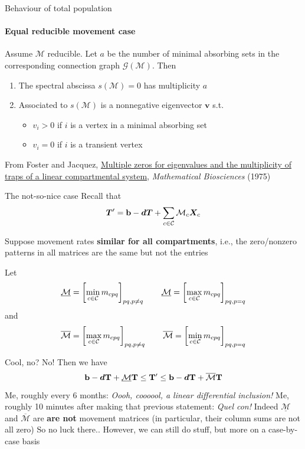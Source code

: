 \documentclass[aspectratio=169]{beamer}\usepackage[]{graphicx}\usepackage[]{xcolor}
\begin{document}
\begin{frame}{Behaviour of total population}
\framesubtitle{Equal reducible movement case}
\begin{theorem}
Assume $\mathcal{M}$ reducible. Let $a$ be the number of minimal absorbing sets in the corresponding connection graph $\mathcal{G}(\mathcal{M})$. Then
\begin{enumerate}
	\item The spectral abscissa $s(\mathcal{M})=0$ has multiplicity $a$
	\item Associated to $s(\mathcal{M})$ is a nonnegative eigenvector $\mathbf{v}$ s.t.
	\begin{itemize}
		\item $v_i>0$ if $i$ is a vertex in a minimal absorbing set
		\item $v_i=0$ if $i$ is a transient vertex
	\end{itemize}
\end{enumerate}
\end{theorem}

\vfill
From Foster and Jacquez, \href{https://doi.org/10.1016/0025-5564(75)90096-6}{Multiple zeros for eigenvalues and the multiplicity of traps of a linear compartmental system}, \emph{Mathematical Biosciences} (1975)
\end{frame}


\begin{frame}{The not-so-nice case}
Recall that
$$
\bm{T}'=\mathbf{b}-\bm{d}\bm{T}+\sum_{c\in\mathcal{C}}\mathcal{M}_c\bm{X}_{c}
$$

Suppose movement rates \textbf{similar for all compartments}, i.e., the zero/nonzero patterns in all matrices are the same but not the entries

Let
$$
\underline{\mathcal{M}}=\left[\min_{c\in\mathcal{C}}m_{cpq}\right]_{pq,p\neq q}\qquad 
\underline{\mathcal{M}}=\left[\max_{c\in\mathcal{C}}m_{cpq}\right]_{pq,p=q}
$$
and
$$
\overline{\mathcal{M}}=\left[\max_{c\in\mathcal{C}}m_{cpq}\right]_{pq,p\neq q}\qquad
\overline{\mathcal{M}}=\left[\min_{c\in\mathcal{C}}m_{cpq}\right]_{pq,p=q}
$$
\end{frame}


\begin{frame}{Cool, no? No!}
Then we have
$$
\mathbf{b}-\bm{d}\mathbf{T}+\underline{\mathcal{M}}\mathbf{T}\leq\mathbf{T}'\leq\mathbf{b}-\bm{d}\mathbf{T}+\overline{\mathcal{M}}\mathbf{T}
$$
\vfill
Me, roughly every 6 months: \emph{Oooh, coooool, a linear differential inclusion!}
\vfill
Me, roughly 10 minutes after making that previous statement: \emph{Quel con!} 
\vfill
Indeed $\underline{\mathcal{M}}$ and $\overline{\mathcal{M}}$ are \textbf{are not} movement matrices  (in particular, their column sums are not all zero)
\vfill
So no luck there.. 
\vfill
However, we can still do stuff, but more on a case-by-case basis
\end{frame}
\end{document}

